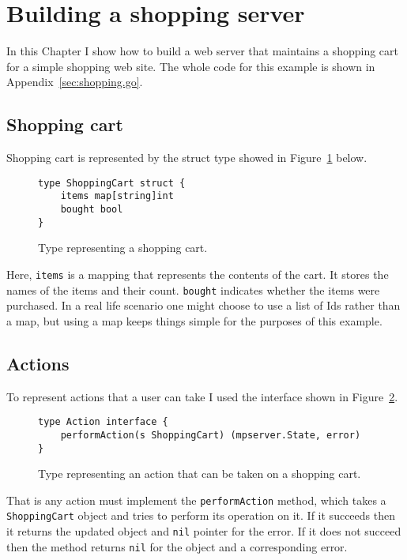\section{Building a shopping server}
\label{sec:shopping}
In this Chapter I show how to build a web server that
maintains a shopping cart for a simple shopping web site. The whole 
code for this example is shown in Appendix~\ref{sec:shopping.go}.

\subsection{Shopping cart}
Shopping cart is represented by the struct type showed in 
Figure~\ref{fig:shoppingCart} below.
\begin{figure}[h]
\begin{lstlisting}
type ShoppingCart struct {
    items map[string]int
    bought bool
}
\end{lstlisting}
\caption[scale=1.0]{Type representing a shopping cart.}
\label{fig:shoppingCart}
\end{figure}

Here, \texttt{items} is 
a mapping that represents the contents of the cart. It stores the names
of the items and their count. \texttt{bought} indicates whether the items
were purchased. In a real life scenario one might choose to use 
a list of Ids rather than a map, but using a map keeps things simple
for the purposes of this example.

\subsection{Actions}
To represent actions that a user can take I used the interface shown in 
Figure~\ref{fig:action}.
\begin{figure}[h]
\begin{lstlisting}
type Action interface {
    performAction(s ShoppingCart) (mpserver.State, error)
}
\end{lstlisting}
\caption[scale=1.0]{Type representing an action that can be taken on 
a shopping cart.}
\label{fig:action}
\end{figure}

That is any action must implement the \texttt{performAction} method, which takes
a \texttt{ShoppingCart} object and tries to perform its operation on it. If
it succeeds then it returns the updated object and \texttt{nil} pointer for the
error. If it does not succeed then the method returns \texttt{nil} for the
object and a corresponding error.

